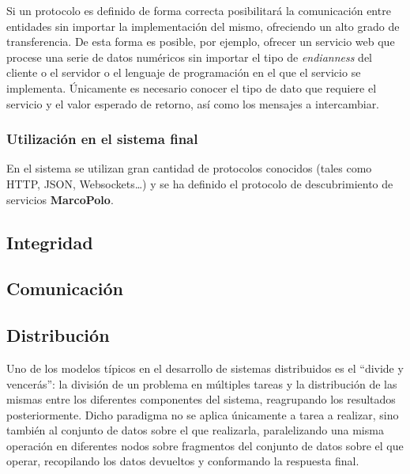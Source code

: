 Si un protocolo es definido de forma correcta posibilitará la comunicación entre entidades sin importar la implementación del mismo, ofreciendo un alto grado de transferencia. De esta forma es posible, por ejemplo, ofrecer un servicio web que procese una serie de datos numéricos sin importar el tipo de \textit{endianness} del cliente o el servidor o el lenguaje de programación en el que el servicio se implementa. Únicamente es necesario conocer el tipo de dato que requiere el servicio y el valor esperado de retorno, así como los mensajes a intercambiar.

\subsubsection{Utilización en el sistema final}
En el sistema se utilizan gran cantidad de protocolos conocidos (tales como HTTP, JSON, Websockets\dots) y se ha definido el protocolo de descubrimiento de servicios \textbf{MarcoPolo}.

\subsection{Integridad}

\subsection{Comunicación}

\subsection{Distribución}

Uno de los modelos típicos en el desarrollo de sistemas distribuidos es el ``divide y vencerás'': la división de un problema en múltiples tareas y la distribución de las mismas entre los diferentes componentes del sistema, reagrupando los resultados posteriormente. Dicho paradigma no se aplica únicamente a tarea a realizar, sino también al conjunto de datos sobre el que realizarla, paralelizando una misma operación en diferentes nodos sobre fragmentos del conjunto de datos sobre el que operar, recopilando los datos devueltos y conformando la respuesta final.


